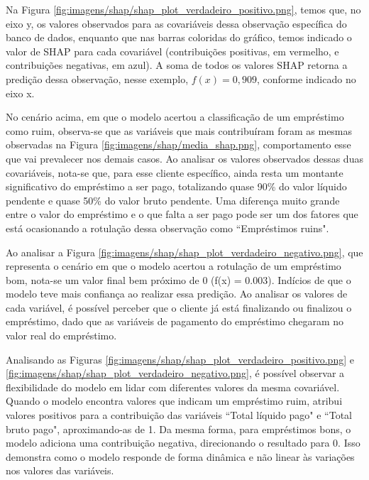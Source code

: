 Na Figura \ref{fig:imagens/shap/shap_plot_verdadeiro_positivo.png}, temos que, no eixo y, 
os valores observados para as covariáveis dessa observação específica do banco de dados, enquanto que nas barras
coloridas do gráfico, temos indicado o valor de SHAP para cada covariável (contribuições positivas, em vermelho,
 e contribuições negativas, em azul). A soma de todos os valores SHAP retorna a predição dessa observação, nesse exemplo,
 $f(x) = 0,909$, conforme indicado no eixo x.

No cenário acima, em que o modelo acertou a classificação de 
um empréstimo como ruim, observa-se que as variáveis que mais contribuíram foram as mesmas observadas na Figura \ref{fig:imagens/shap/media_shap.png}, 
comportamento esse que vai prevalecer nos demais casos.
Ao analisar os valores observados dessas duas covariáveis, nota-se que, para esse cliente específico, ainda resta um montante significativo do empréstimo a ser pago, 
totalizando quase 90\% do valor líquido pendente e quase 50\% do valor bruto pendente. Uma diferença muito grande
entre o valor do empréstimo e o que falta a ser pago pode ser um dos fatores que está ocasionando a rotulação dessa observação
como ``Empréstimos ruins". 


Ao analisar a Figura \ref{fig:imagens/shap/shap_plot_verdadeiro_negativo.png}, que representa o cenário em que o modelo
acertou a rotulação de um empréstimo bom, nota-se um valor final bem próximo de  0 (f(x) = 0.003). Indícios 
de que o modelo teve mais confiança ao realizar essa predição. 
Ao analisar os valores de cada variável, é possível perceber que o cliente já está finalizando ou finalizou o empréstimo,
dado que as variáveis de pagamento do empréstimo chegaram no valor real do empréstimo.


Analisando as Figuras \ref{fig:imagens/shap/shap_plot_verdadeiro_positivo.png} e \ref{fig:imagens/shap/shap_plot_verdadeiro_negativo.png},
é possível observar a 
flexibilidade do modelo em lidar com diferentes valores da mesma covariável. Quando o modelo encontra valores que indicam um 
empréstimo ruim, atribui valores positivos para a contribuição das variáveis ``Total líquido pago" e ``Total bruto pago", aproximando-as de 1. Da mesma forma, para 
empréstimos bons, o modelo adiciona uma contribuição negativa, direcionando o resultado para 0. Isso demonstra como o modelo 
responde de forma dinâmica e não linear às variações nos valores das variáveis.


